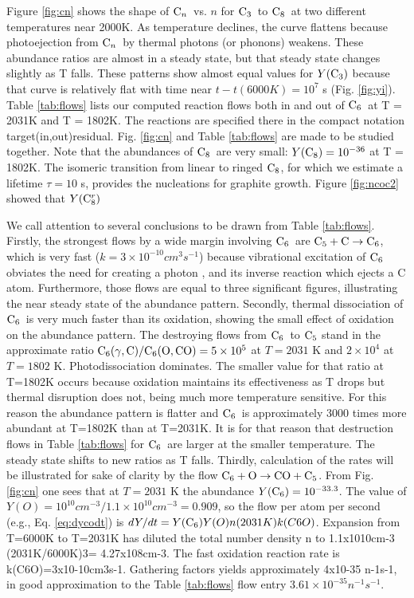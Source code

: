 \documentclass[manuscript]{aastex}
\newcommand{\cthree}{{\rm C}_3}
\newcommand{\cfive}{{\rm C}_5}
\newcommand{\csix}{{\rm C}_6}
\newcommand{\ceight}{{\rm C}_8}
\newcommand{\ceightr}{{\rm C}_8^r}
\newcommand{\cenn}{{\rm C}_n}
\newcommand{\cfivectocsix}{$\cfive + {\rm C} \to \csix$}
\newcommand{\csixotococfive}{${\rm C}_6 + {\rm O} \to {\rm CO} + {\rm C_5}$}
\begin{document}
Figure \ref{fig:cn} shows the shape of $\cenn$\ vs. $n$ for $\cthree$\ to
$\ceight$\ at two different temperatures near 2000K. As temperature declines,
the curve flattens because photoejection from $\cenn$\ by thermal photons
(or phonons) weakens. These abundance ratios are almost in a steady state,
but that steady state changes slightly as T falls. These patterns show
almost equal values for $Y(\cthree)$ because that curve is relatively flat
with time near $t-t(6000K) = 10^7$ s (Fig. \ref{fig:yi}).
Table \ref{tab:flows} lists our computed reaction flows both in and out of
$\csix$\ at T = 2031K and T = 1802K. The reactions are specified there in the
compact notation target(in,out)residual. Fig. \ref{fig:cn} and
Table \ref{tab:flows} are made to be studied together.
Note that the abundances of $\ceight$\ are very small:
$Y(\ceight)= 10^{-36}$ at T = 1802K. The isomeric transition from linear to
ringed $\ceight$, for which we estimate a lifetime $\tau = 10$ s,
provides the nucleations for graphite growth. Figure \ref{fig:ncoc2} showed
that $Y(\ceightr)$ 

We call attention to several conclusions to be drawn from Table \ref{tab:flows}.
Firstly, the strongest flows by a wide margin involving $\csix$\ are
\cfivectocsix,
which is very fast ($k = 3 \times 10^{-10} cm^3 s^{-1}$)
because vibrational excitation of $\csix$
obviates the need for creating a photon \citep{1999Sci...283.1290C},
and its inverse reaction which ejects a C atom. Furthermore, those flows
are equal to three significant figures, illustrating the near steady
state of the abundance pattern. Secondly, thermal dissociation of $\csix$\ is
very much faster than its oxidation, showing the small effect of oxidation
on the abundance pattern. The destroying flows from $\csix$\ to $\cfive$
stand in the approximate ratio
${\rm C}_6(\gamma,{\rm C})/{\rm C_6}({\rm O},{\rm CO}) = 5 \times 10^5$
at $T = 2031$ K and $2 \times 10^4$ at $T = 1802$ K.
Photodissociation dominates. The smaller value for that ratio at T=1802K
occurs because oxidation maintains its effectiveness as T drops but
thermal disruption does not, being much more temperature sensitive.
For this reason the abundance pattern is flatter and $\csix$\ is approximately
3000 times more abundant at T=1802K than at T=2031K.
It is for that reason that destruction flows in Table \ref{tab:flows}
for $\csix$\ are
larger at the smaller temperature.
The steady state shifts to new ratios as T falls.
Thirdly, calculation of the rates will be illustrated for sake of clarity
by the flow
\csixotococfive.
From Fig. \ref{fig:cn}
one sees that at $T = 2031$ K the abundance $Y(\csix) = 10^{-33.3}$.
The value of $Y(O) = 10^{10} cm^{-3} / 1.1 \times 10^{10} cm^{-3} = 0.909$,
so the flow per atom per
second (e.g., Eq. \ref{eq:dycodt}) is $dY/dt= Y(\csix)Y(O)n(2031K)k(C6O)$.
Expansion from T=6000K to T=2031K has diluted the total number
density n to 1.1x1010cm-3 (2031K/6000K)3= 4.27x108cm-3.
The fast oxidation reaction rate is  k(C6O)=3x10-10cm3s-1.
Gathering factors yields approximately 4x10-35 n-1s-1,
in good approximation to the Table \ref{tab:flows}
flow entry $3.61 \times 10^{-35} n^{-1}s^{-1}$. 
\end{document}
